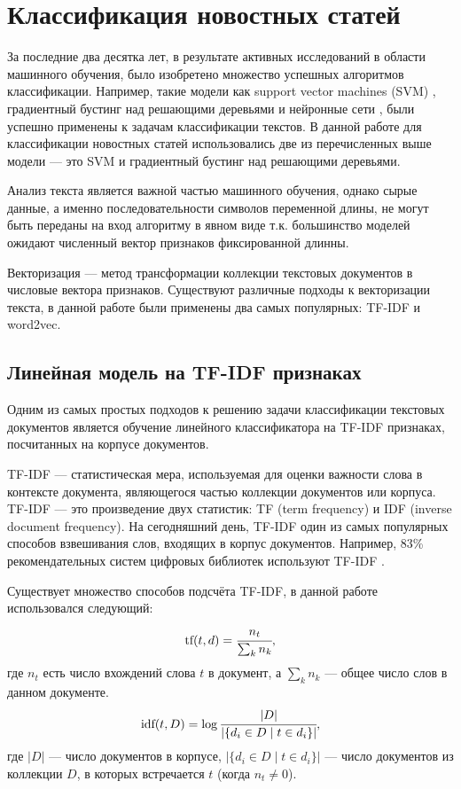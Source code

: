 \documentclass[a4paper, 14pt]{extarticle}
\begin{document}
\section{Классификация новостных статей}
За последние два десятка лет, в результате активных исследований в области машинного обучения,
было изобретено множество успешных алгоритмов классификации. Например, такие модели как support vector machines (SVM) \cite{weston99svms},
градиентный бустинг над решающими деревьями и нейронные сети \cite{DBLP:journals/corr/ConneauSBL16}, были успешно применены к задачам классификации текстов.
В данной работе для классификации новостных статей использовались две из перечисленных выше модели --- это SVM и градиентный бустинг
над решающими деревьями.

Анализ текста является важной частью машинного обучения, однако сырые данные, а именно последовательности символов переменной длины,
не могут быть переданы на вход алгоритму в явном виде т.к. большинство моделей ожидают численный вектор признаков фиксированной длинны.

Векторизация --- метод трансформации коллекции текстовых документов в числовые вектора признаков.
Существуют различные подходы к векторизации текста, в данной работе были применены два самых популярных: TF-IDF и word2vec.

\subsection{Линейная модель на TF-IDF признаках}
Одним из самых простых подходов к решению задачи классификации текстовых документов является обучение линейного классификатора на
TF-IDF признаках, посчитанных на корпусе документов.

TF-IDF \cite{doi:10.1108/eb026526} --- статистическая мера, используемая для оценки важности слова в контексте 
документа, являющегося частью коллекции документов или корпуса.
TF-IDF --- это произведение двух статистик: TF (term frequency) и IDF (inverse 
document frequency). На сегодняшний день, TF-IDF один из самых популярных способов взвешивания слов, входящих в корпус документов.
Например, 83\% рекомендательных систем цифровых библиотек используют TF-IDF \cite{Beel2016}.

Существует множество способов подсчёта TF-IDF, в данной работе использовался следующий:
$$
\text{tf}(t, d) = \cfrac{n_t}{\sum_{k} n_k},
$$
где $n_{t}$ есть число вхождений слова $t$ в документ, а $\sum_{k} n_k$ --- общее число слов в данном документе.
$$
\text{idf}(t, D) = \log{ \cfrac{|D|}{|\{ d_i \in D \mid t \in d_i \}|}},
$$
где $|D|$ --- число документов в корпусе, $|\{ d_i \in D \mid t \in d_i \}|$ — число документов из коллекции $D$, в которых встречается 
$t$ (когда $n_{t} \neq 0$).
\end{document}
